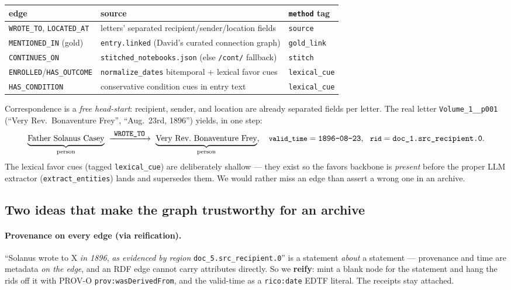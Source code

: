 \documentclass[11pt]{article}
\newcommand{\code}[1]{\texttt{\small #1}}
\begin{document}
\begin{numbersbox}
\centering\small
\begin{tabular}{lll}
\toprule
edge & source & \code{method} tag \\
\midrule
\code{WROTE\_TO}, \code{LOCATED\_AT} & letters' separated recipient/sender/location fields & \code{source} \\
\code{MENTIONED\_IN} (gold)          & \code{entry.linked} (David's curated connection graph) & \code{gold\_link} \\
\code{CONTINUES\_ON}                 & \code{stitched\_notebooks.json} (else \code{/cont/} fallback) & \code{stitch} \\
\code{ENROLLED}/\code{HAS\_OUTCOME}  & \code{normalize\_dates} bitemporal $+$ lexical favor cues & \code{lexical\_cue} \\
\code{HAS\_CONDITION}                & conservative condition cues in entry text & \code{lexical\_cue} \\
\bottomrule
\end{tabular}
\end{numbersbox}

\noindent Correspondence is a \emph{free head-start}: recipient, sender, and location are already
separated fields per letter. The real letter \code{Volume\_1\_\_p001} (``Very Rev.\ Bonaventure
Frey'', ``Aug.\ 23rd, 1896'') yields, in one step:
\[
\underbrace{\text{Father Solanus Casey}}_{\text{person}}
\ \xrightarrow{\ \code{WROTE\_TO}\ }\
\underbrace{\text{Very Rev.\ Bonaventure Frey}}_{\text{person}},
\quad
\code{valid\_time}=\texttt{1896-08-23},\ \ \code{rid}=\texttt{doc\_1.src\_recipient.0}.
\]
The lexical favor cues (tagged \code{lexical\_cue}) are deliberately shallow --- they exist so the
favors backbone is \emph{present} before the proper LLM extractor (\code{extract\_entities}) lands and
supersedes them. We would rather miss an edge than assert a wrong one in an archive.

\subsection{Two ideas that make the graph trustworthy for an archive}

\paragraph{Provenance on every edge (via reification).} ``Solanus wrote to X \emph{in 1896}, \emph{as
evidenced by region} \code{doc\_5.src\_recipient.0}'' is a statement \emph{about} a statement ---
provenance and time are metadata \emph{on the edge}, and an RDF edge cannot carry attributes directly.
So we \textbf{reify}: mint a blank node for the statement and hang the rids off it with PROV-O
\code{prov:wasDerivedFrom}, and the valid-time as a \code{rico:date} EDTF literal. The receipts stay
attached.
\end{document}
